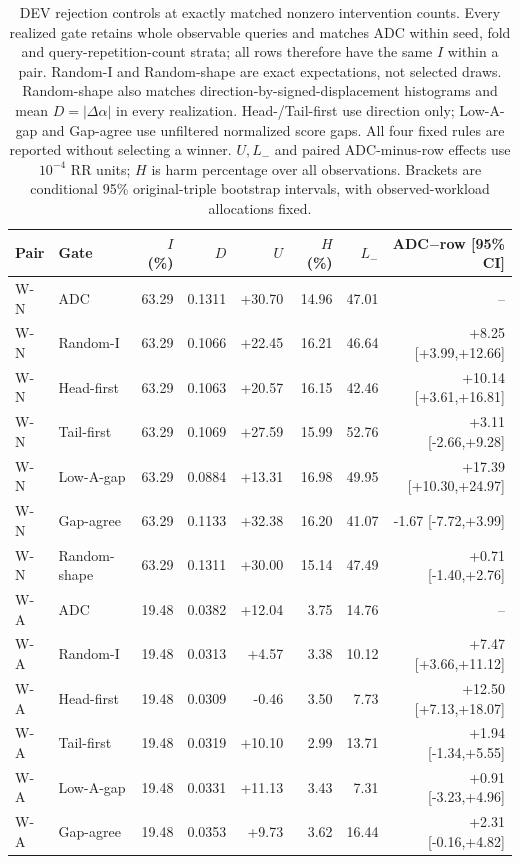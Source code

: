 \begin{table}[htbp]
\centering\footnotesize\setlength{\tabcolsep}{3pt}
\caption{DEV rejection controls at exactly matched nonzero intervention counts. Every realized gate retains whole observable queries and matches ADC within seed, fold and query-repetition-count strata; all rows therefore have the same $I$ within a pair. Random-I and Random-shape are exact expectations, not selected draws. Random-shape also matches direction-by-signed-displacement histograms and mean $D=|\Delta\alpha|$ in every realization. Head-/Tail-first use direction only; Low-A-gap and Gap-agree use unfiltered normalized score gaps. All four fixed rules are reported without selecting a winner. $U,L_-$ and paired ADC-minus-row effects use $10^{-4}$ RR units; $H$ is harm percentage over all observations. Brackets are conditional 95\% original-triple bootstrap intervals, with observed-workload allocations fixed.}
\label{tab:rejection-dev_oof}
\begin{tabular}{llrrrrrr}
\toprule
Pair & Gate & $I$ (\%) & $D$ & $U$ & $H$ (\%) & $L_-$ & ADC$-$row [95\% CI]\\
\midrule
W-N & ADC & 63.29 & 0.1311 & +30.70 & 14.96 & 47.01 & --\\
W-N & Random-I & 63.29 & 0.1066 & +22.45 & 16.21 & 46.64 & +8.25 [+3.99,+12.66]\\
W-N & Head-first & 63.29 & 0.1063 & +20.57 & 16.15 & 42.46 & +10.14 [+3.61,+16.81]\\
W-N & Tail-first & 63.29 & 0.1069 & +27.59 & 15.99 & 52.76 & +3.11 [-2.66,+9.28]\\
W-N & Low-A-gap & 63.29 & 0.0884 & +13.31 & 16.98 & 49.95 & +17.39 [+10.30,+24.97]\\
W-N & Gap-agree & 63.29 & 0.1133 & +32.38 & 16.20 & 41.07 & -1.67 [-7.72,+3.99]\\
W-N & Random-shape & 63.29 & 0.1311 & +30.00 & 15.14 & 47.49 & +0.71 [-1.40,+2.76]\\
W-A & ADC & 19.48 & 0.0382 & +12.04 & 3.75 & 14.76 & --\\
W-A & Random-I & 19.48 & 0.0313 & +4.57 & 3.38 & 10.12 & +7.47 [+3.66,+11.12]\\
W-A & Head-first & 19.48 & 0.0309 & -0.46 & 3.50 & 7.73 & +12.50 [+7.13,+18.07]\\
W-A & Tail-first & 19.48 & 0.0319 & +10.10 & 2.99 & 13.71 & +1.94 [-1.34,+5.55]\\
W-A & Low-A-gap & 19.48 & 0.0331 & +11.13 & 3.43 & 7.31 & +0.91 [-3.23,+4.96]\\
W-A & Gap-agree & 19.48 & 0.0353 & +9.73 & 3.62 & 16.44 & +2.31 [-0.16,+4.82]\\

\end{tabular}
\end{table}
